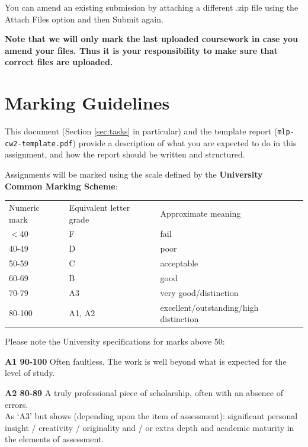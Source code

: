 \documentclass[11pt,]{article}
\begin{document}
You can amend an existing submission by attaching a different .zip file using the Attach Files option and then Submit again.

\textbf{Note that we will only mark the last uploaded coursework in case you amend your files. Thus it is your responsibility to make sure that correct files are uploaded.}



\section{Marking Guidelines}
\label{sec:marking-scheme}
This document (Section \ref{sec:tasks} in particular) and the template report (\verb+mlp-cw2-template.pdf+) provide a description of what you are expected to do in this assignment, and how the report should be written and structured.

Assignments will be marked using the scale defined by the \textbf{University Common Marking Scheme}:
\begin{center}
\begin{tabular}{lll}
Numeric mark & Equivalent letter grade & Approximate meaning \\
$< 40$ & F & fail \\
40-49 & D & poor \\
50-59 & C & acceptable \\
60-69 & B & good \\
70-79 & A3 & very good/distinction \\
80-100 & A1, A2 & excellent/outstanding/high distinction
\end{tabular}
\end{center}

Please note the University specifications for marks above 50:

{\bf A1 90-100}
Often faultless. The work is well beyond what is expected for the level of study.

{\bf A2 80-89}
A truly professional piece of scholarship, often with an absence of errors. \\
As `A3' but shows (depending upon the item of assessment):
significant personal insight / creativity / originality
and / or
extra depth and academic maturity in the elements of assessment.
\end{document}

